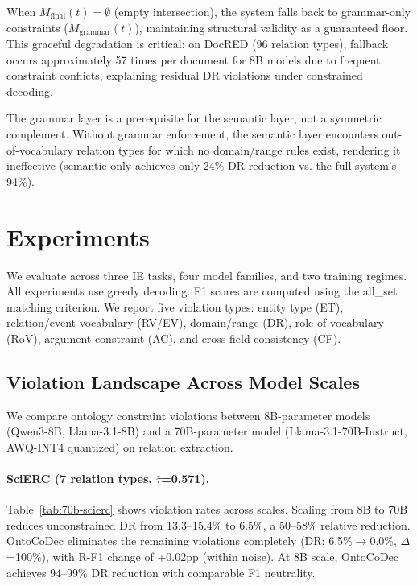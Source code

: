 \documentclass[11pt,a4paper]{article}
\begin{document}
When $M_{\text{final}}(t) = \emptyset$ (empty intersection), the system falls back to grammar-only constraints ($M_{\text{grammar}}(t)$), maintaining structural validity as a guaranteed floor. This graceful degradation is critical: on DocRED (96 relation types), fallback occurs approximately 57 times per document for 8B models due to frequent constraint conflicts, explaining residual DR violations under constrained decoding.

The grammar layer is a prerequisite for the semantic layer, not a symmetric complement. Without grammar enforcement, the semantic layer encounters out-of-vocabulary relation types for which no domain/range rules exist, rendering it ineffective (semantic-only achieves only 24\% DR reduction vs. the full system's 94\%).

\section{Experiments}

We evaluate across three IE tasks, four model families, and two training regimes. All experiments use greedy decoding. F1 scores are computed using the all\_set matching criterion. We report five violation types: entity type (ET), relation/event vocabulary (RV/EV), domain/range (DR), role-of-vocabulary (RoV), argument constraint (AC), and cross-field consistency (CF).

\subsection{Violation Landscape Across Model Scales}

We compare ontology constraint violations between 8B-parameter models (Qwen3-8B, Llama-3.1-8B) and a 70B-parameter model (Llama-3.1-70B-Instruct, AWQ-INT4 quantized) on relation extraction.

\paragraph{SciERC (7 relation types, $\bar{\tau}$=0.571).}
Table~\ref{tab:70b-scierc} shows violation rates across scales. Scaling from 8B to 70B reduces unconstrained DR from 13.3--15.4\% to 6.5\%, a 50--58\% relative reduction. OntoCoDec eliminates the remaining violations completely (DR: 6.5\%$\to$0.0\%, $\Delta$=100\%), with R-F1 change of +0.02pp (within noise). At 8B scale, OntoCoDec achieves 94--99\% DR reduction with comparable F1 neutrality.
\end{document}
